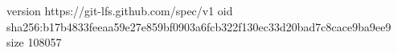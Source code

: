 version https://git-lfs.github.com/spec/v1
oid sha256:b17b4833feeaa59e27e859bf0903a6fcb322f130ec33d20bad7c8cace9ba9ee9
size 108057
